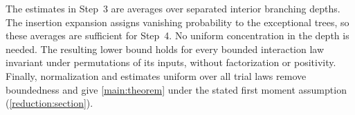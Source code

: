The estimates in Step~3 are averages over separated interior branching
depths. The insertion expansion assigns vanishing probability to the
exceptional trees, so these averages are sufficient for Step~4. No
uniform concentration in the depth is needed. The resulting lower bound
holds for every bounded interaction law invariant under permutations of
its inputs, without factorization or positivity. Finally, normalization
and estimates uniform over all trial laws remove boundedness and give
\cref{main:theorem} under the stated first moment assumption
(\cref{reduction:section}).
